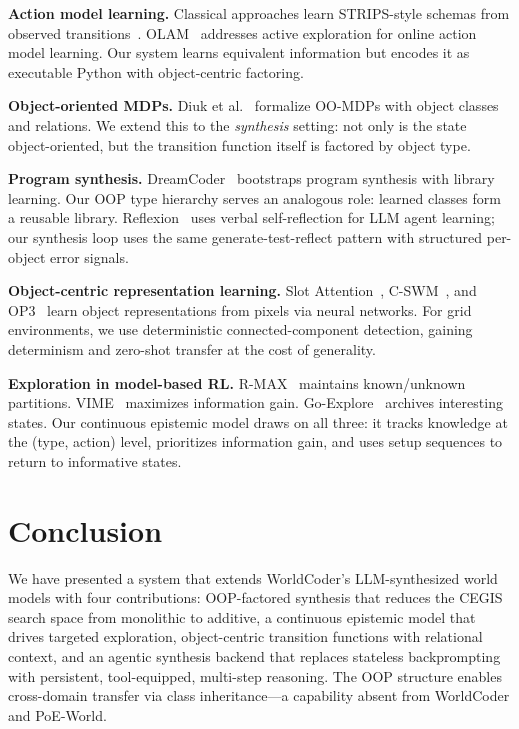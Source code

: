 \documentclass{article}
\begin{document}
\textbf{Action model learning.}
Classical approaches learn STRIPS-style schemas from observed
transitions~\cite{cresswell2011acquiring, arora2018review, juba2021safe}.
OLAM~\cite{lamanna2021olam} addresses active exploration for online action
model learning.  Our system learns equivalent information but encodes it as
executable Python with object-centric factoring.

\textbf{Object-oriented MDPs.}
Diuk et al.~\cite{diuk2008oomdp} formalize OO-MDPs with object classes and
relations.  We extend this to the \emph{synthesis} setting: not only is the
state object-oriented, but the transition function itself is factored by
object type.

\textbf{Program synthesis.}
DreamCoder~\cite{ellis2021dreamcoder} bootstraps program synthesis with
library learning.  Our OOP type hierarchy serves an analogous role: learned
classes form a reusable library.
Reflexion~\cite{shinn2024reflexion} uses verbal self-reflection for
LLM agent learning; our synthesis loop uses the same generate-test-reflect
pattern with structured per-object error signals.

\textbf{Object-centric representation learning.}
Slot Attention~\cite{locatello2020object},
C-SWM~\cite{kipf2020contrastive}, and OP3~\cite{veerapaneni2020entity}
learn object representations from pixels via neural networks.  For
grid environments, we use deterministic connected-component detection,
gaining determinism and zero-shot transfer at the cost of generality.

\textbf{Exploration in model-based RL.}
R-MAX~\cite{brafman2002rmax} maintains known/unknown partitions.
VIME~\cite{houthooft2016vime} maximizes information gain.
Go-Explore~\cite{ecoffet2021first} archives interesting states.
Our continuous epistemic model draws on all three: it tracks knowledge at
the (type, action) level, prioritizes information gain, and uses setup
sequences to return to informative states.



\section{Conclusion}
\label{sec:conclusion}

We have presented a system that extends WorldCoder's LLM-synthesized world
models with four contributions: OOP-factored synthesis that reduces the CEGIS
search space from monolithic to additive, a continuous epistemic model that
drives targeted exploration, object-centric transition functions with
relational context, and an agentic synthesis backend that replaces stateless
backprompting with persistent, tool-equipped, multi-step reasoning.  The OOP
structure enables cross-domain transfer via class inheritance---a capability
absent from WorldCoder and PoE-World.
\end{document}
